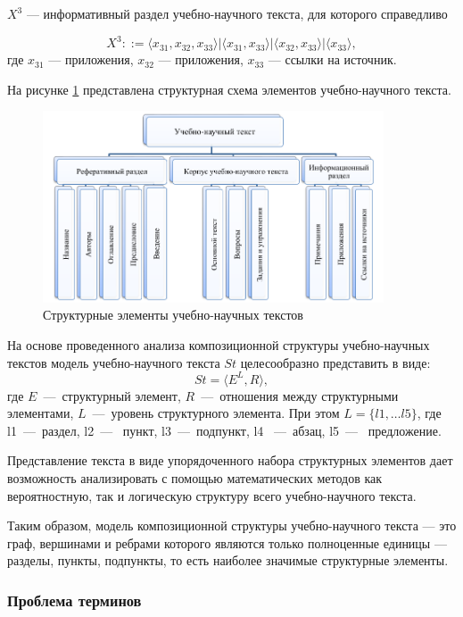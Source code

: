 $ X^{3} $ — информативный раздел учебно-научного текста, для которого справедливо

$$
X^{3} ::= \langle x_{31}, x_{32}, x_{33}\rangle |\langle x_{31}, x_{33}\rangle |\langle x_{32}, x_{33}\rangle |\langle x_{33}\rangle ,
$$
где $ x_{31} $ — приложения, $ x_{32} $ — приложения, $ x_{33} $ — ссылки на источник.

На рисунке \ref{fig:ts} представлена структурная схема элементов учебно-научного текста. 

\begin{figure}[H]
	\centering
	\includegraphics[width=0.9\textwidth]{img/tagging-struct.png}
	\caption{Структурные элементы учебно-научных текстов}
	\label{fig:ts}
\end{figure}

На основе проведенного анализа композиционной структуры учебно-научных текстов модель учебно-научного текста $St$ целесообразно представить в виде: 
$$
St = \langle E^L, R \rangle,
$$
где $E$~---~структурный элемент, $R$~---~отношения между структурными элементами, $L$~---~уровень структурного элемента.
При этом $L = \{l1, \dots l5\}$, где l1~---~раздел, l2~---~ пункт,  l3~---~подпункт, l4 ~---~абзац, l5~---~ предложение.~\cite{butenko2021}

Представление текста в виде упорядоченного набора структурных элементов дает возможность анализировать с помощью математических методов как вероятностную, так и логическую структуру всего учебно-научного текста.

Таким образом, модель композиционной структуры учебно-научного текста --- это граф, вершинами и ребрами которого являются только полноценные единицы --- разделы, пункты, подпункты, то есть наиболее значимые структурные элементы.~\cite{butenko2021}

\newpage

\subsubsection{Проблема терминов}

